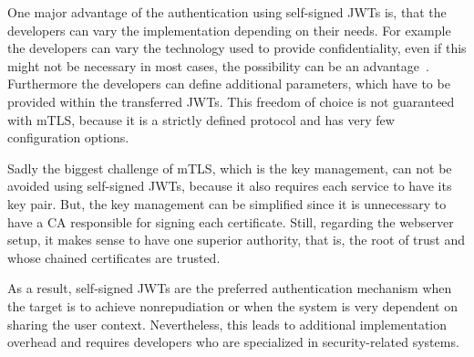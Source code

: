 One major advantage of the authentication using self-signed JWTs is, that the developers can vary the implementation depending on their needs.
For example the developers can vary the technology used to provide confidentiality, even if this might not be necessary in most cases, the possibility can be an advantage~\cite{dias2020microservices}.
Furthermore the developers can define additional parameters, which have to be provided within the transferred JWTs.
This freedom of choice is not guaranteed with mTLS, because it is a strictly defined protocol and has very few configuration options.


Sadly the biggest challenge of mTLS, which is the key management, can not be avoided using self-signed JWTs, because it also requires each service to have its key pair.
But, the key management can be simplified since it is unnecessary to have a CA responsible for signing each certificate.
Still, regarding the webserver setup, it makes sense to have one superior authority, that is, the root of trust and whose chained certificates are trusted.

As a result, self-signed JWTs are the preferred authentication mechanism when the target is to achieve nonrepudiation or when the system is very dependent on sharing the user context.
Nevertheless, this leads to additional implementation overhead and requires developers who are specialized in security-related systems.
